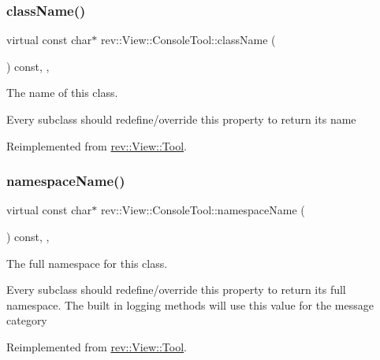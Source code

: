 \subsubsection{\texorpdfstring{className()}{className()}}
{\footnotesize\ttfamily virtual const char$\ast$ rev\+::\+View\+::\+Console\+Tool\+::class\+Name (\begin{DoxyParamCaption}{ }\end{DoxyParamCaption}) const\hspace{0.3cm}{\ttfamily [inline]}, {\ttfamily [override]}, {\ttfamily [virtual]}}



The name of this class. 

Every subclass should redefine/override this property to return its name 

Reimplemented from \mbox{\hyperlink{classrev_1_1_view_1_1_tool_acde27fd51c9e99e42da65703b496c080}{rev\+::\+View\+::\+Tool}}.

\mbox{\label{classrev_1_1_view_1_1_console_tool_a8168c00a344099bff9626a775408aac4}} 
\subsubsection{\texorpdfstring{namespaceName()}{namespaceName()}}
{\footnotesize\ttfamily virtual const char$\ast$ rev\+::\+View\+::\+Console\+Tool\+::namespace\+Name (\begin{DoxyParamCaption}{ }\end{DoxyParamCaption}) const\hspace{0.3cm}{\ttfamily [inline]}, {\ttfamily [override]}, {\ttfamily [virtual]}}



The full namespace for this class. 

Every subclass should redefine/override this property to return its full namespace. The built in logging methods will use this value for the message category 

Reimplemented from \mbox{\hyperlink{classrev_1_1_view_1_1_tool_ab5359d977478b9c3e30267bcc4e4a853}{rev\+::\+View\+::\+Tool}}.

\mbox{\label{classrev_1_1_view_1_1_console_tool_ac8f85a1067d6aa26f66a89e475d1f24a}} 
